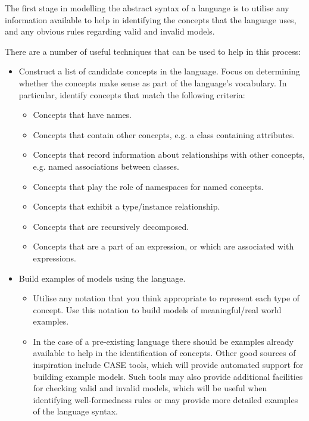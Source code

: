 The first stage in modelling the abstract syntax of a language is to utilise any information available to help in identifying the concepts that the language uses, and any obvious rules regarding valid and invalid models. 

There are a number of useful techniques that can be used to help in this process:

\begin{itemize}

\item Construct a list of candidate concepts in the language. Focus on determining whether the concepts make sense as part of the language's vocabulary. In particular, identify concepts that match the following criteria:

\begin{itemize}
  \item Concepts that have names.
   \item Concepts that contain other concepts, e.g. a class containing attributes.
  \item Concepts that record information about relationships with other concepts, e.g. named associations between classes.
  \item Concepts that play the role of namespaces for named concepts.
  \item Concepts that exhibit a type/instance relationship.
  \item Concepts that are recursively decomposed.
  \item Concepts that are a part of an expression, or which are associated with expressions.
\end{itemize}

\item Build examples of models using the language. 

\begin{itemize}
\item Utilise any notation that you think appropriate to represent each type of concept. Use this notation to build models of meaningful/real world examples. 
\item In the case of a pre-existing language there should be examples already available to help in the identification of concepts. Other good sources of inspiration include CASE tools, which will provide automated support for building example models. Such tools may also provide additional facilities for checking valid and invalid models, which will be useful when identifying well-formedness rules or may provide more detailed examples of the language syntax. 
\end{itemize}
 
\end{itemize}

